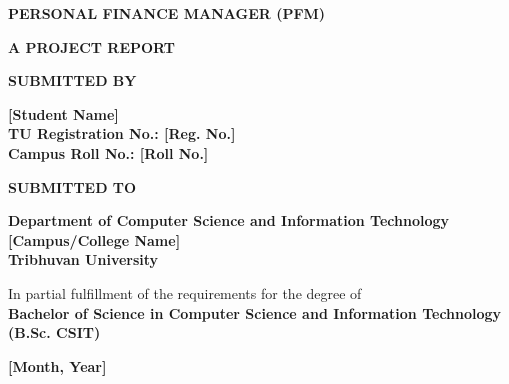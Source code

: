 \documentclass[12pt, a4paper]{report}
\begin{document}
\begin{titlepage}
    \begin{center}
        \vspace*{1cm}
        
        \textbf{\large PERSONAL FINANCE MANAGER (PFM)}
        
        \vspace{1.5cm}
        
        \textbf{A PROJECT REPORT}
        
        \vspace{1.5cm}
        
        \textbf{SUBMITTED BY}
        
        \textbf{[Student Name]} \\
        \textbf{TU Registration No.: [Reg. No.]} \\
        \textbf{Campus Roll No.: [Roll No.]}
        
        \vspace{1.5cm}
        
        \textbf{SUBMITTED TO}
        
        \textbf{Department of Computer Science and Information Technology} \\
        \textbf{[Campus/College Name]} \\
        \textbf{Tribhuvan University}
        
        \vspace{1.5cm}
        
        In partial fulfillment of the requirements for the degree of \\
        \textbf{Bachelor of Science in Computer Science and Information Technology (B.Sc. CSIT)}
        
        \vspace{1.5cm}
        
        \textbf{[Month, Year]}
        
    \end{center}
\end{titlepage}

\setcounter{page}{2} %
\end{document}
